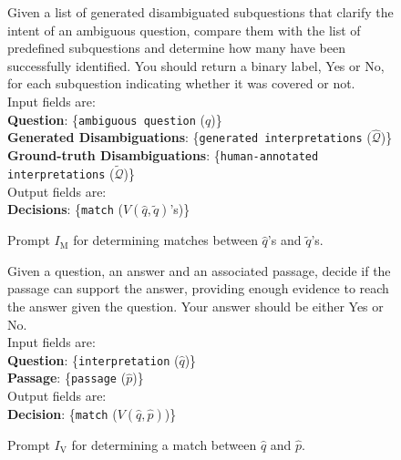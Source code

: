 \begin{figure*}[!htbp]
\centering
\begin{tcolorbox}[boxrule=0pt, title=Evaluation Prompt for Ungrounded Precision/Recall]
Given a list of generated disambiguated subquestions that clarify the intent of an ambiguous question, compare them with the list of predefined subquestions and determine how many have been successfully identified. You should return a binary label, Yes or No, for each subquestion indicating whether it was covered or not.\\

Input fields are:\\
\textbf{Question}: \{\texttt{ambiguous question} ($q$)\}\\
\textbf{Generated Disambiguations}: \{\texttt{generated interpretations} ($\hat{\mathcal{Q}}$)\}\\
\textbf{Ground-truth Disambiguations}: \{\texttt{human-annotated interpretations} ($\tilde{\mathcal{Q}}$)\}\\

Output fields are:\\
\textbf{Decisions}:  \{\texttt{match} ($V(\hat{q},\tilde{q})$'s)\} \\
\end{tcolorbox}
\caption{Prompt $I_{\textrm{M}}$ for determining matches between $\hat{q}$'s and $\tilde{q}$'s.}
\label{fig:prompt_q_Q_match}
\end{figure*}




\begin{figure*}[!htbp]
\centering
\begin{tcolorbox}[boxrule=0pt, title=Evaluation Prompt for Verification]
Given a question, an answer and an associated passage, decide if the passage can support the answer, providing enough evidence to reach the answer given the question.
Your answer should be either Yes or No.\\

Input fields are:\\
\textbf{Question}: \{\texttt{interpretation} ($\hat{q}$)\}\\
\textbf{Passage}: \{\texttt{passage} ($\hat{p}$)\}\\

Output fields are:\\
\textbf{Decision}:  \{\texttt{match} ($V(\hat{q},\hat{p})$)\} \\
\end{tcolorbox}
\caption{Prompt $I_{\textrm{V}}$ for determining a match between $\hat{q}$ and $\hat{p}$.}
\label{fig:prompt_q_p_veirfy}
\end{figure*}


